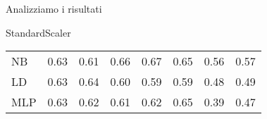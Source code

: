 \documentclass{beamer}
\begin{document}
\begin{frame}{Analizziamo i risultati}
\begin{block}{StandardScaler}
\begin{center}
\begin{adjustbox}{max width=\textwidth}
\begin{tabular}{lrrrrrrr}
				NB  &  0.63 &                  0.61 &                   0.66 &                   0.67 &                   0.65 &                    0.56 &                    0.57 \\
				LD  &  0.63 &                  0.64 &                   0.60 &                   0.59 &                   0.59 &                    0.48 &                    0.49 \\
				MLP &  0.63 &                  0.62 &                   0.61 &                   0.62 &                   0.65 &                    0.39 &                    0.47 \\
				\bottomrule
			\end{tabular}
		\end{adjustbox}
	\end{center}
\end{block}
\end{frame}
\end{document}
